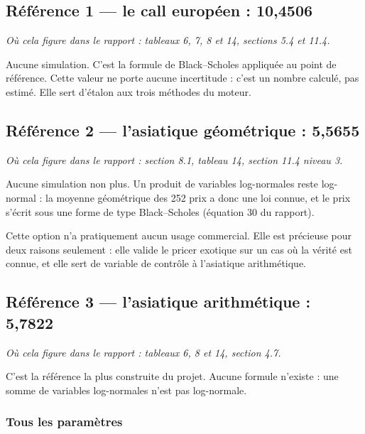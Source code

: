 \documentclass[11pt,a4paper]{article}
\newcommand{\ou}[1]{\textit{\small Où cela figure dans le rapport : #1}}
\begin{document}
\subsection{Référence 1 --- le call européen : 10,4506}

\ou{tableaux 6, 7, 8 et 14, sections 5.4 et 11.4.}

Aucune simulation. C'est la formule de Black--Scholes appliquée au point de
référence. Cette valeur ne porte aucune incertitude : c'est un nombre calculé,
pas estimé. Elle sert d'étalon aux trois méthodes du moteur.

\subsection{Référence 2 --- l'asiatique géométrique : 5,5655}

\ou{section 8.1, tableau 14, section 11.4 niveau 3.}

Aucune simulation non plus. Un produit de variables log-normales reste
log-normal : la moyenne géométrique des 252 prix a donc une loi connue, et le
prix s'écrit sous une forme de type Black--Scholes (équation 30 du rapport).

Cette option n'a pratiquement aucun usage commercial. Elle est précieuse pour
deux raisons seulement : elle valide le pricer exotique sur un cas où la vérité
est connue, et elle sert de variable de contrôle à l'asiatique arithmétique.

\subsection{Référence 3 --- l'asiatique arithmétique : 5,7822}

\ou{tableaux 6, 8 et 14, section 4.7.}

C'est la référence la plus construite du projet. Aucune formule n'existe :
une somme de variables log-normales n'est pas log-normale.

\subsubsection*{Tous les paramètres}
\end{document}
